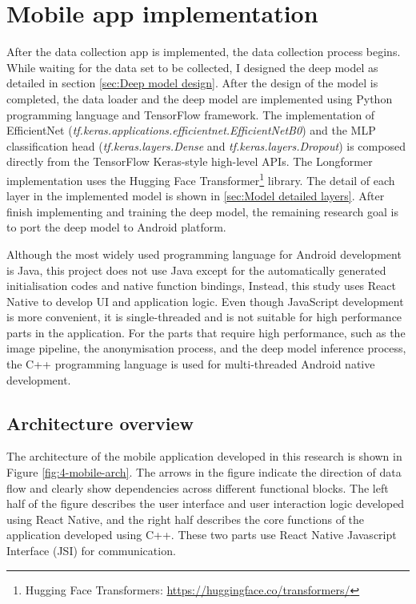 \section{Mobile app implementation}
\label{sec:Mobile app implementation}
After the data collection app is implemented, the data collection process begins.
While waiting for the data set to be collected, I designed the deep model as detailed in section \ref{sec:Deep model design}.
After the design of the model is completed, the data loader and the deep model are implemented using Python programming language and TensorFlow framework.
The implementation of EfficientNet (\textit{tf.keras.applications.efficientnet.EfficientNetB0}) and the MLP classification head (\textit{tf.keras.layers.Dense} and \textit{tf.keras.layers.Dropout}) is composed directly from the TensorFlow Keras-style high-level APIs.
The Longformer implementation uses the Hugging Face Transformer\footnote{Hugging Face Transformers: \url{https://huggingface.co/transformers/}} library.
The detail of each layer in the implemented model is shown in \ref{sec:Model detailed layers}.
After finish implementing and training the deep model, the remaining research goal is to port the deep model to Android platform.

Although the most widely used programming language for Android development is Java, this project does not use Java except for the automatically generated initialisation codes and native function bindings,
Instead, this study uses React Native to develop UI and application logic.
Even though JavaScript development is more convenient, it is single-threaded and is not suitable for high performance parts in the application.
For the parts that require high performance, such as the image pipeline, the anonymisation process, and the deep model inference process, the C++ programming language is used for multi-threaded Android native development.

\subsection{Architecture overview}
The architecture of the mobile application developed in this research is shown in Figure \ref{fig:4-mobile-arch}.
The arrows in the figure indicate the direction of data flow and clearly show dependencies across different functional blocks.
The left half of the figure describes the user interface and user interaction logic developed using React Native, and the right half describes the core functions of the application developed using C++.
These two parts use React Native Javascript Interface (JSI) for communication.


